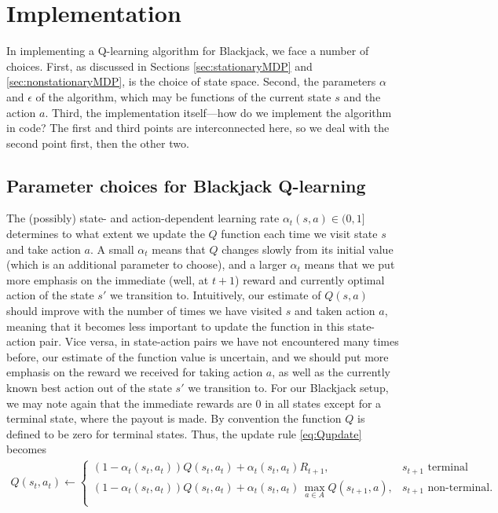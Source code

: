 \section{Implementation} \label{sec:implementation}
In implementing a Q-learning algorithm for Blackjack, we face a number of choices.
First, as discussed in Sections \ref{sec:stationaryMDP} and \ref{sec:nonstationaryMDP}, is the choice of state space.
Second, the parameters $\alpha$ and $\epsilon$ of the algorithm, which may be functions of the current state $s$ and
the action $a$. Third, the implementation itself---how do we implement the algorithm in code? The first and third points
are interconnected here, so we deal with the second point first, then the other two.

\subsection{Parameter choices for Blackjack Q-learning} \label{sec:paramchoices}
The (possibly) state- and action-dependent learning rate $\alpha_t(s, a) \in (0, 1]$ determines to what extent we update 
the $Q$ function each time we visit state $s$ and take action $a$. A small $\alpha_t$ means that $Q$ changes slowly
from its initial value (which is an additional parameter to choose), and a larger $\alpha_t$ means that we put more
emphasis on the immediate (well, at $t+1$) reward and currently optimal action of the state $s'$ we transition to.
%
Intuitively, our estimate of $Q(s,a)$ should improve with the number of times we have visited $s$ and taken action $a$,
meaning that it becomes less important to update the function in this state-action pair. Vice versa, in state-action pairs
we have not encountered many times before, our estimate of the function value is uncertain, and we should put more emphasis
on the reward we received for taking action $a$, as well as the currently known best action out of the state $s'$ we transition to.
For our Blackjack setup, we may note again that the immediate rewards are 0 in all states except for a terminal state, where the payout is made. 
By convention the function $Q$ is defined to be zero for terminal states. Thus, the update rule \eqref{eq:Qupdate} becomes
\begin{align} \label{eq:bjQupdate}
          Q(s_t,a_t)  \leftarrow 
          \begin{cases}
            (1-\alpha_t(s_t,a_t))Q(s_t,a_t) + \alpha_t(s_t,a_t) R_{t+1}, &s_{t+1} \text{ terminal} \\
            (1-\alpha_t(s_t,a_t))Q(s_t,a_t) + \alpha_t(s_t,a_t) \, \underset{a \in A}{\max} Q(s_{t+1},a), &s_{t+1} \text{ non-terminal}. \\
          \end{cases}
\end{align}

